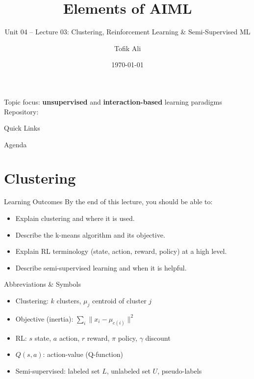 \documentclass[aspectratio=169]{beamer}
\title[Elements of AIML]{Elements of AIML}
\subtitle{Unit 04 -- Lecture 03: Clustering, Reinforcement Learning \& Semi-Supervised ML}
\author{Tofik Ali}
\institute{School of Computer Science, UPES Dehradun}
\date{\today}
\begin{document}
\UPESCoverFrame
\setcounter{framenumber}{0}

\begin{frame}
  \titlepage
  \vspace{0.3em}
  \begin{center}
    \footnotesize Topic focus: \textbf{unsupervised} and \textbf{interaction-based} learning paradigms\\[0.25em]
    \footnotesize Repository: \texttt{\AIMLRepoURL}
  \end{center}
  \slidesources{\AIMLUnitIVSources}
\end{frame}

\begin{frame}{Quick Links}
  \centering
  \hyperlink{sec:cluster}{}\hspace{0.6em}
  \hyperlink{sec:kmeans}{}\hspace{0.6em}
  \hyperlink{sec:semi}{}\hspace{0.6em}
  \hyperlink{sec:rl}{}\hspace{0.6em}
  \hyperlink{sec:summary}{}
\end{frame}

\begin{frame}{Agenda}
  \tableofcontents
\end{frame}

\section{Clustering}
\label{sec:cluster}

\begin{frame}{Learning Outcomes}
  By the end of this lecture, you should be able to:
  \begin{itemize}[<+->]
    \item Explain clustering and where it is used.
    \item Describe the k-means algorithm and its objective.
    \item Explain RL terminology (state, action, reward, policy) at a high level.
    \item Describe semi-supervised learning and when it is helpful.
  \end{itemize}
\end{frame}

\begin{frame}{Abbreviations \& Symbols}
  \begin{itemize}[<+->]
    \item Clustering: $k$ clusters,\; $\mu_j$ centroid of cluster $j$
    \item Objective (inertia): $\sum_i \|x_i-\mu_{c(i)}\|^2$
    \item RL: $s$ state,\; $a$ action,\; $r$ reward,\; $\pi$ policy,\; $\gamma$ discount
    \item $Q(s,a)$: action-value (Q-function)
    \item Semi-supervised: labeled set $L$, unlabeled set $U$, pseudo-labels
  \end{itemize}
\end{frame}
\end{document}
